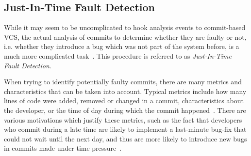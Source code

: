 \subsection{Just-In-Time Fault Detection}

While it may seem to be uncomplicated to hook analysis events to commit-based VCS, the actual analysis of commits to determine whether they are faulty or not, i.e. whether they introduce a bug which was not part of the system before, is a much more complicated task~\cite{Nayrolles2018, Kamei2013}. This procedure is referred to as \textit{Just-In-Time Fault Detection}.

When trying to identify potentially faulty commits, there are many metrics and characteristics that can be taken into account. Typical metrics include how many lines of code were added, removed or changed in a commit, characteristics about the developer, or the time of day during which the commit happened~\cite{Goyal2017}. There are various motivations which justify these metrics, such as the fact that developers who commit during a late time are likely to implement a last-minute bug-fix that could not wait until the next day, and thus are more likely to introduce new bugs in commits made under time pressure~\cite{Goyal2017}.


